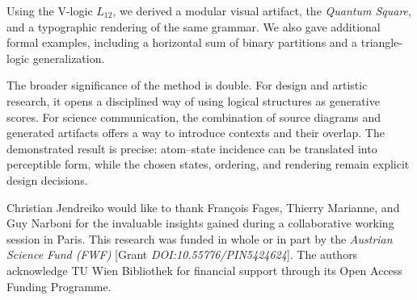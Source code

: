 \documentclass[
  10pt,
  twocolumn,
  aps,
  pra,
  showkeys,
  amsmath,amssymb,
  longbibliography
]{revtex4-2}
\begin{document}
Using the V-logic \(L_{12}\), we derived a modular visual artifact, the \emph{Quantum Square}, and a typographic rendering of the same grammar. We also gave additional formal examples, including a horizontal sum of binary partitions and a triangle-logic generalization.

The broader significance of the method is double. For design and artistic research, it opens a disciplined way of using logical structures as generative scores. For science communication, the combination of source diagrams and generated artifacts offers a way to introduce contexts and their overlap. The demonstrated result is precise: atom--state incidence can be translated into perceptible form, while the chosen states, ordering, and rendering remain explicit design decisions.

\begin{acknowledgments}
Christian Jendreiko would like to thank Fran\c{c}ois Fages, Thierry Marianne, and Guy Narboni for the invaluable insights gained during a collaborative working session in Paris.
This research was funded in whole or in part by the \textit{Austrian Science Fund (FWF)} [Grant \textit{DOI:10.55776/PIN5424624}].
The authors acknowledge TU Wien Bibliothek for financial support through its Open Access Funding Programme.
\end{acknowledgments}


\end{document}
